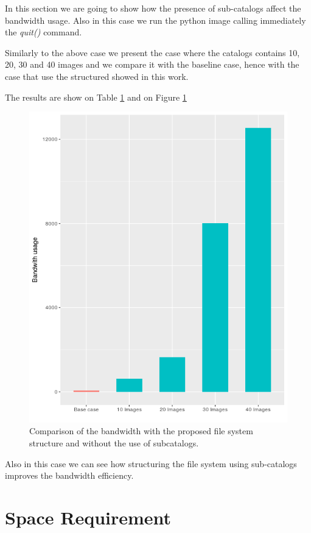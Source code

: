 In this section we are going to show how the presence of sub-catalogs affect the bandwidth usage. Also in this case we run the python image calling immediately the \textit{quit()} command.

Similarly to the above case we present the case where the catalogs contains 10, 20, 30 and 40 images and we compare it with the baseline case, hence with the case that use the structured showed in this work.

The results are show on Table \ref{} and on Figure \ref{fig:bandwidth-usage}

\begin{figure}[]{}
    \includegraphics[width=\textwidth]{gfx/bandwidth-catalog}
        \caption{Comparison of the bandwidth with the proposed file system structure and without the use of subcatalogs.  }
        \label{fig:bandwidth-usage}
\end{figure}


Also in this case we can see how structuring the file system using sub-catalogs
improves the bandwidth efficiency.

\section{Space Requirement}

